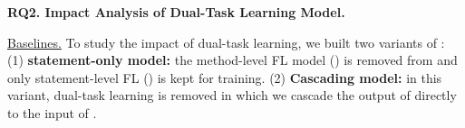 
%
%





\vspace{3pt}
{\bf RQ2. Impact Analysis of Dual-Task Learning Model.}

\underline{Baselines.} To study the impact of dual-task learning, we built two variants of {\tool}: 
(1) \textbf{statement-only model:} the method-level FL model
() is removed from {\tool} and only statement-level FL
() is kept for training. (2) \textbf{Cascading model:} in
this variant, dual-task learning is removed in which we cascade the
output of  directly to the input of .



